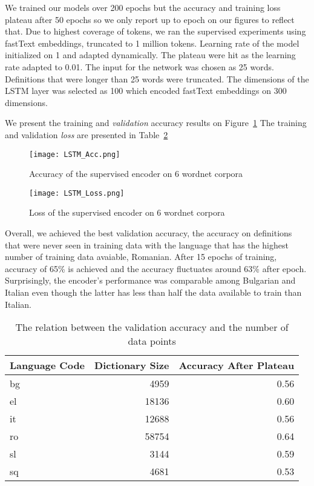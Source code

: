 We trained our models over 200 epochs but the accuracy and training loss plateau after 50 epochs so we only report up to  epoch on our figures to reflect that.
Due to highest coverage of tokens, we ran the supervised experiments using fastText embeddings, truncated to 1 million tokens.
Learning rate of the model initialized on 1 and adapted dynamically.
The plateau were hit as the learning rate adapted to 0.01.
The input for the network was chosen as 25 words.
Definitions that were longer than 25 words were truncated.
The dimensions of the LSTM layer was selected as 100 which encoded fastText embeddings on 300 dimensions.

We present the training and \emph{validation} accuracy results on Figure~\ref{fig:LSTM_Acc}
The training and validation \emph{loss} are presented in Table~\ref{fig:LSTM_loss}

\begin{figure}[htpb]
    \centering
    \texttt{[image: LSTM\_Acc.png]}
    \caption{Accuracy of the supervised encoder on 6 wordnet corpora}%
    \label{fig:LSTM_Acc}
\end{figure}


\begin{figure}[htpb]
    \centering
    \texttt{[image: LSTM\_Loss.png]}
    \caption{Loss of the supervised encoder on 6 wordnet corpora}%
    \label{fig:LSTM_loss}
\end{figure}

Overall, we achieved the best validation accuracy, the accuracy on definitions that were never seen in training data with the language that has the highest number of training data avaiable, Romanian.
After 15 epochs of training, accuracy of 65\% is achieved and the accuracy fluctuates around 63\% after  epoch.
Surprisingly, the encoder's performance was comparable among Bulgarian and Italian even though the latter has less than half the data available to train than Italian.

\begin{table}[htbp]
    \centering
    \begin{tabulary}{1\linewidth}{L R R}
        \toprule
        Language Code & Dictionary Size & Accuracy After Plateau  \\
        \midrule
        bg & 4959 & 0.56  \\
        el & 18136 & 0.60  \\
        it & 12688 & 0.56  \\
        ro & 58754 & 0.64  \\
        sl & 3144 & 0.59  \\
        sq & 4681 & 0.53 \\
        \bottomrule
    \end{tabulary}
    \caption{The relation between the validation accuracy and the number of data points}%
    \label{tab:lstm_size_acc}
\end{table}


